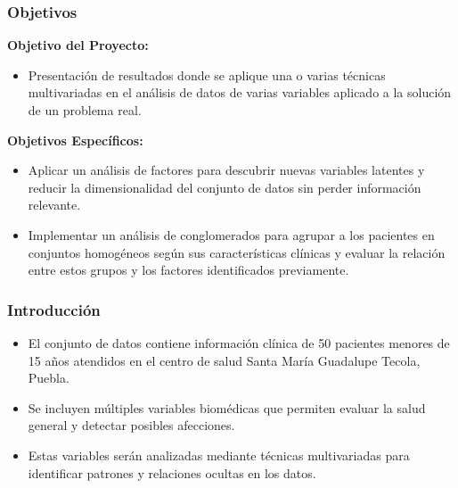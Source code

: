\documentclass[
	11pt, %
]{beamer}
\begin{document}
\begin{frame}
    \frametitle{Objetivos} %
    \textbf{Objetivo del Proyecto:}
    \begin{itemize}
        \item Presentación de resultados donde se aplique una o varias técnicas multivariadas en el análisis de datos de varias variables aplicado a la solución de un problema real.
    \end{itemize}

    \vspace{0.5cm}

    \textbf{Objetivos Específicos:}
    \begin{itemize}
        \item Aplicar un análisis de factores para descubrir nuevas variables latentes y reducir la dimensionalidad del conjunto de datos sin perder información relevante.
        \item Implementar un análisis de conglomerados para agrupar a los pacientes en conjuntos homogéneos según sus características clínicas y evaluar la relación entre estos grupos y los factores identificados previamente.
    \end{itemize}
\end{frame}


\begin{frame}
    \frametitle{Introducción} %
    \begin{itemize}
        \item El conjunto de datos contiene información clínica de 50 pacientes menores de 15 años atendidos en el centro de salud Santa María Guadalupe Tecola, Puebla.
        \item Se incluyen múltiples variables biomédicas que permiten evaluar la salud general y detectar posibles afecciones.
        \item Estas variables serán analizadas mediante técnicas multivariadas para identificar patrones y relaciones ocultas en los datos.
    \end{itemize}
\end{frame}

\end{document}
